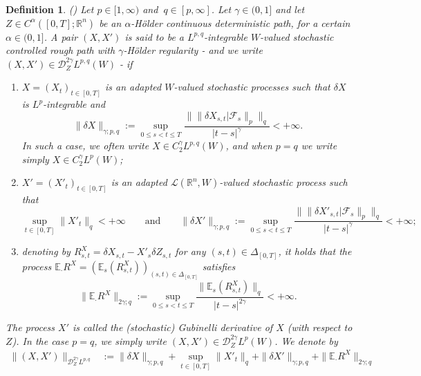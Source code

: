 \documentclass[11pt,a4paper]{article}
\newcommand{\R}{\mathbb{R}}
\newcommand{\E}{\mathbb{E}}
\newtheorem{defn}{Definition}[section]
\theoremstyle{plain}
\begin{document}
\begin{defn}\label{def:stochasticcontrolledpaths}
(\cite[Definition 3.1]{FHL21})
Let $p\in [1,\infty)$ and $\ q \in [p,\infty]$. Let $\gamma \in (0,1]$ and let $Z \in {C}^\alpha([0,T];\R^n)$ be an $\alpha$-Hölder continuous deterministic path, for a certain $\alpha \in (0,1]$.  
A pair $(X,X')$ is said to be a $L^{p,q}$-integrable $W$-valued \textit{stochastic controlled rough path} with $\gamma$-Hölder regularity - and we write $(X,X') \in \mathscr{D}_Z^{2\gamma} L^{p,q}(W)$ - if 
\begin{enumerate} \renewcommand{\labelenumi}{\alph{enumi})}
\item $X=(X_t)_{t \in [0,T]}$ is an adapted $W$-valued stochastic processes such that $\delta X$ is $L^p$-integrable and \begin{equation*}
    \|\delta X\|_{\gamma;p,q} := \sup_{0\le s < t\le T} \frac{\|\|\delta X_{s,t}|\mathcal{F}_s\|_p\|_q}{|t-s|^\gamma} < +\infty.
\end{equation*} 
In such a case, we often write $X\in {C}_2^{\gamma} L^{p,q}(W)$, and when $p=q$ we write simply $X\in {C}_2^{\gamma} L^{p}(W)$;
\item $X'=(X'_t)_{t \in [0,T]}$ is an adapted $\mathscr{L}(\R^n,W)$-valued stochastic process such that
\begin{equation*} 
    \sup_{t \in [0,T]} \|X'_t\|_q < +\infty \qquad \text{and} \qquad 
    \|\delta X'\|_{\gamma;p,q} := \sup_{0\le s < t\le T} \frac{\|\|\delta X'_{s,t}|\mathcal{F}_s\|_p\|_q}{|t-s|^{\gamma}} < +\infty;
\end{equation*}
\item denoting by $R^X_{s,t}=\delta X_{s,t} - X'_s \delta Z_{s,t} $ for any $(s,t)\in\Delta_{[0,T]}$, it holds that the process $\E_\cdot R^X=(\E_s(R^X_{s,t}))_{(s,t)\in\Delta_{[0,T]}}$ satisfies
\begin{equation*}
    \|\E_\cdot R^X\|_{2\gamma;q}:=\sup_{0\le s < t \le T} \frac{\|\E_s(R^X_{s,t})\|_q}{|t-s|^{2\gamma}} < + \infty.
\end{equation*} 
\end{enumerate}
The process $X'$ is called the (stochastic) Gubinelli derivative of $X$ (with respect to $Z$). In the case $p=q$, we simply write $(X,X') \in \mathscr{D}_Z^{2\gamma} L^{p}(W)$. We denote by \begin{align*}
    \|(X,X')\|_{\mathscr{D}_Z^{2\gamma}L^{p,q}} &:= \|\delta X\|_{\gamma;p,q} + \sup_{t \in [0,T]} \|X'_t\|_q + \|\delta X'\|_{\gamma;p,q} + \|\E_\cdot R^X\|_{2\gamma;q} \\

\end{align*}
\end{defn}
\end{document}
